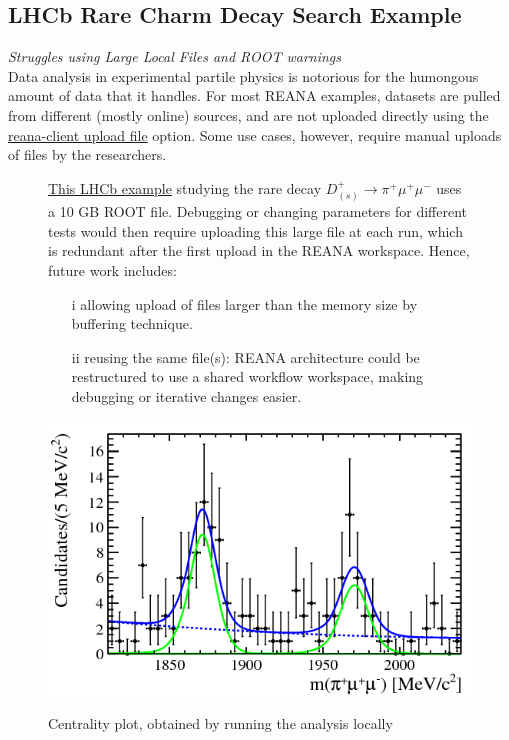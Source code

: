\subsection{LHCb Rare Charm Decay Search Example}
\vspace{-1em}
\textit{Struggles using Large Local Files and ROOT warnings}\\
Data analysis in experimental partile physics is notorious for the humongous amount of data that it handles. For most REANA examples, datasets are pulled from different (mostly online) sources, and are not uploaded directly using the \href{https://reana-client.readthedocs.io/en/latest/userguide.html}{reana-client upload file} option. Some use cases, however, require manual uploads of files by the researchers. 


\begin{figure}[H]
    \centering
    \begin{minipage}[H]{0.49\textwidth}
\noindent
\href{https://github.com/reanahub/reana-demo-lhcb-d2pimumu}{This LHCb example} studying the rare decay $D_{(s)}^{+}\rightarrow \pi^{+} \mu^{+} \mu ^{-}$ uses a 10 GB ROOT file. Debugging or changing parameters for different tests would then require uploading this large file at each run, which is redundant after the first upload in the REANA workspace. Hence, future work includes:
\begin{itemize}
    \item[i] allowing upload of files larger than the memory size by buffering technique.
    \item[ii] reusing the same file(s): REANA architecture could be restructured to use a shared workflow workspace, making debugging or iterative changes easier.
\end{itemize}

     \end{minipage}
 \hfill
    \begin{minipage}[H]{0.49\textwidth}
        \centering
        \includegraphics[width=1.0\textwidth]{figures/lhcb_eta.png}\\
        \caption{Centrality plot, obtained by running the analysis locally}
        \label{fig:lhcb_eta}
     \end{minipage}
\end{figure}
